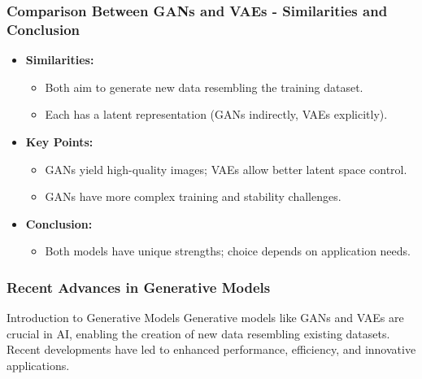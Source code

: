 \documentclass[aspectratio=169]{beamer}
\begin{document}
\begin{frame}[fragile]
    \frametitle{Comparison Between GANs and VAEs - Similarities and Conclusion}
    \begin{itemize}
        \item \textbf{Similarities:}
        \begin{itemize}
            \item Both aim to generate new data resembling the training dataset.
            \item Each has a latent representation (GANs indirectly, VAEs explicitly).
        \end{itemize}
        
        \item \textbf{Key Points:}
        \begin{itemize}
            \item GANs yield high-quality images; VAEs allow better latent space control.
            \item GANs have more complex training and stability challenges.
        \end{itemize}
        
        \item \textbf{Conclusion:}
        \begin{itemize}
            \item Both models have unique strengths; choice depends on application needs.
        \end{itemize}
    \end{itemize}
\end{frame}

\begin{frame}[fragile]
    \frametitle{Recent Advances in Generative Models}
    \begin{block}{Introduction to Generative Models}
        Generative models like GANs and VAEs are crucial in AI, enabling the creation of new data resembling existing datasets. Recent developments have led to enhanced performance, efficiency, and innovative applications.
    \end{block}
\end{frame}
\end{document}
